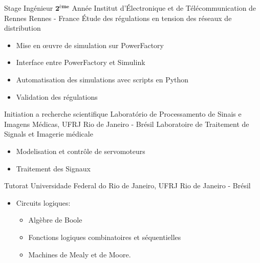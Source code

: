 \documentclass[11pt,a4paper,sans]{moderncv}
\begin{document}
{Stage Ingénieur $ \mathbf{2^{ème}} $ Année}
{\newline Institut d'Électronique et de Télécommunication de Rennes}
{\newline Rennes - France \newline Étude des régulations en tension des réseaux
  de distribution}
{}{
  \begin{itemize}
  \item Mise en \oe uvre de simulation sur PowerFactory 
  \item Interface entre PowerFactory et Simulink 
  \item Automatisation des simulations avec scripts en Python
  \item Validation des régulations 
  \end{itemize}
}

{Initiation a recherche scientifique}
{\newline Laboratório de Processamento de Sinais e Imagens Médicas, UFRJ}
{\newline Rio de Janeiro - Brésil \newline Laboratoire de Traitement de Signals
  et Imagerie médicale}
{}{
  \begin{itemize}
  \item Modelisation et contrôle de servomoteurs
  \item Traitement des Signaux
  \end{itemize}
}

{Tutorat}
{\newline Universidade Federal do Rio de Janeiro, UFRJ}
{Rio de Janeiro - Brésil}
{}{
  \begin{itemize}
  \item Circuits logiques: 
    \begin{itemize}
    \item Algèbre de Boole
    \item Fonctions logiques combinatoires et séquentielles 
    \item Machines de Mealy et de Moore.
    \end{itemize}
  \end{itemize}
}
\end{document}
